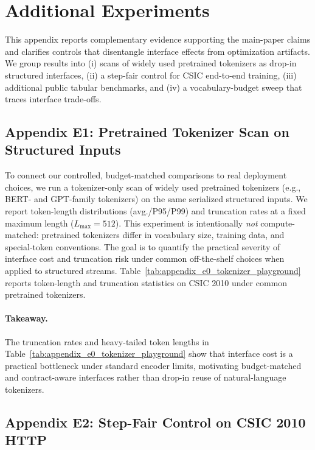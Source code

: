 \appendix

\section{Additional Experiments}
\label{sec:appendix_experiments}

This appendix reports complementary evidence supporting the main-paper claims and clarifies controls that disentangle interface effects from optimization artifacts.
We group results into (i) scans of widely used pretrained tokenizers as drop-in structured interfaces, (ii) a step-fair control for CSIC end-to-end training, (iii) additional public tabular benchmarks, and (iv) a vocabulary-budget sweep that traces interface trade-offs.

\subsection{Appendix E1: Pretrained Tokenizer Scan on Structured Inputs}
\label{sec:appendix_e1_tokscan}

To connect our controlled, budget-matched comparisons to real deployment choices, we run a tokenizer-only scan of widely used pretrained tokenizers (e.g., BERT- and GPT-family tokenizers) on the same serialized structured inputs.
We report token-length distributions (avg./P95/P99) and truncation rates at a fixed maximum length ($L_{\max}{=}512$).
This experiment is intentionally \emph{not} compute-matched: pretrained tokenizers differ in vocabulary size, training data, and special-token conventions.
The goal is to quantify the practical severity of interface cost and truncation risk under common off-the-shelf choices when applied to structured streams.
Table~\ref{tab:appendix_e0_tokenizer_playground} reports token-length and truncation statistics on CSIC 2010 under common pretrained tokenizers.


\paragraph{Takeaway.}
The truncation rates and heavy-tailed token lengths in Table~\ref{tab:appendix_e0_tokenizer_playground} show that interface cost is a practical bottleneck under standard encoder limits, motivating budget-matched and contract-aware interfaces rather than drop-in reuse of natural-language tokenizers.

\subsection{Appendix E2: Step-Fair Control on CSIC 2010 HTTP}
\label{sec:appendix_e2_stepfair}

